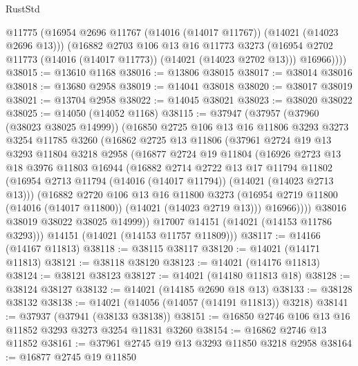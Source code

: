 \begin{lexlean}{RustStd}
\begin{coremodule}
          @11775
          (@16954 @2696 @11767 (@14016 (@14017 @11767)) (@14021 (@14023 @2696 @13)))
          (@16882
            @2703
            @106
            @13
            @16
            @11773
            @3273
            (@16954 @2702 @11773 (@14016 (@14017 @11773)) (@14021 (@14023 @2702 @13)))
            @16966))))
@38015 := @13610 @1168
@38016 := @13806 @38015
@38017 := @38014 @38016
@38018 := @13680 @2958
@38019 := @14041 @38018
@38020 := @38017 @38019
@38021 := @13704 @2958
@38022 := @14045 @38021
@38023 := @38020 @38022
@38025 := @14050 (@14052 @1168)
@38115 := @37947
    (@37957
      (@37960 (@38023 @38025 @14999))
      (@16850
        @2725
        @106
        @13
        @16
        @11806
        @3293
        @3273
        @3254
        @11785
        @3260
        (@16862
          @2725
          @13
          @11806
          (@37961
            @2724
            @19
            @13
            @3293
            @11804
            @3218
            @2958
            (@16877
              @2724
              @19
              @11804
              (@16926
                @2723
                @13
                @18
                @3976
                @11803
                @16944
                (@16882
                  @2714
                  @2722
                  @13
                  @17
                  @11794
                  @11802
                  (@16954 @2713 @11794 (@14016 (@14017 @11794)) (@14021 (@14023 @2713 @13)))
                  (@16882
                    @2720
                    @106
                    @13
                    @16
                    @11800
                    @3273
                    (@16954 @2719 @11800 (@14016 (@14017 @11800)) (@14021 (@14023 @2719 @13)))
                    @16966))))
            @38016
            @38019
            @38022
            @38025
            @14999))
        @17007
        @14151
        (@14021 (@14153 @11786 @3293)))
      @14151
      (@14021 (@14153 @11757 @11809)))
@38117 := @14166 (@14167 @11813)
@38118 := @38115 @38117
@38120 := @14021 (@14171 @11813)
@38121 := @38118 @38120
@38123 := @14021 (@14176 @11813)
@38124 := @38121 @38123
@38127 := @14021 (@14180 @11813 @18)
@38128 := @38124 @38127
@38132 := @14021 (@14185 @2690 @18 @13)
@38133 := @38128 @38132
@38138 := @14021 (@14056 (@14057 (@14191 @11813)) @3218)
@38141 := @37937 (@37941 (@38133 @38138))
@38151 := @16850 @2746 @106 @13 @16 @11852 @3293 @3273 @3254 @11831 @3260
@38154 := @16862 @2746 @13 @11852
@38161 := @37961 @2745 @19 @13 @3293 @11850 @3218 @2958
@38164 := @16877 @2745 @19 @11850

\end{coremodule}
\end{lexlean}
